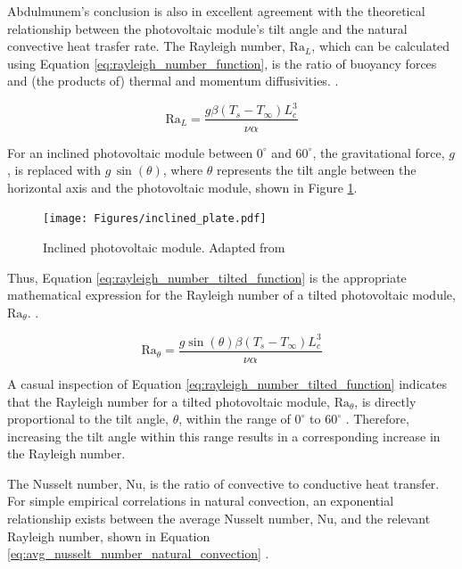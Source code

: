 Abdulmunem's conclusion is also in excellent agreement with the theoretical relationship between the photovoltaic module's tilt angle and the natural convective heat trasfer rate. The Rayleigh number, $\text{Ra}_L$, which can be calculated using Equation \ref{eq:rayleigh_number_function}, is the ratio of buoyancy forces and (the products of) thermal and momentum diffusivities. \cite{Cengel2014NaturalConvection}.

\begin{equation}
    \text{Ra}_L = \frac{g\beta(T_s-T_\infty)L_c^3}{\nu\alpha}
    \label{eq:rayleigh_number_function}
\end{equation}

For an inclined photovoltaic module between $0^\circ$ and $60^\circ$, the gravitational force, $g$, is replaced with $g\,\sin(\theta)$, where $\theta$ represents the tilt angle between the horizontal axis and the photovoltaic module, shown in Figure \ref{fig:inclined_plate}.

\begin{figure}[H]
    \centering
    \texttt{[image: Figures/inclined\_plate.pdf]}
    \caption{Inclined photovoltaic module. Adapted from \cite{Cengel2014NaturalConvection}}
    \label{fig:inclined_plate}
\end{figure}

Thus, Equation \ref{eq:rayleigh_number_tilted_function} is the appropriate mathematical expression for the Rayleigh number of a tilted photovoltaic module, $\text{Ra}_\theta$. \cite{Cengel2014NaturalConvection}.

\begin{equation}
    \text{Ra}_\theta = \frac{g\sin(\theta)\beta(T_s-T_\infty)L_c^3}{\nu\alpha}
    \label{eq:rayleigh_number_tilted_function}
\end{equation}

A casual inspection of Equation \ref{eq:rayleigh_number_tilted_function} indicates that the Rayleigh number for a tilted photovoltaic module, $\text{Ra}_\theta$, is directly proportional to the tilt angle, $\theta$, within the range of $0^\circ$ to $60^\circ$ \cite{Cengel2014NaturalConvection}. Therefore, increasing the tilt angle within this range results in a corresponding increase in the Rayleigh number.\vspace{0.5em}

The Nusselt number, $\text{Nu}$, is the ratio of convective to conductive heat transfer. \cite{Basu2019MassMeter} For simple empirical correlations in natural convection, an exponential relationship exists between the average Nusselt number, $\text{Nu}$, and the relevant Rayleigh number, shown in Equation \ref{eq:avg_nusselt_number_natural_convection} \cite{Cengel2014NaturalConvection}.

